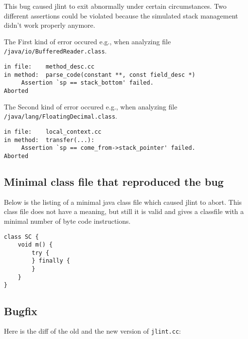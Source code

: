 \documentclass[11pt,twoside,a4paper,draft]{article}
\begin{document}
This bug caused jlint to exit abnormally under certain circumstances.
Two different assertions could be violated because the simulated stack
management didn't work properly anymore. 

The First kind of error occured e.g., when analyzing file \newline
\texttt{/java/io/BufferedReader.class}.

\begin{verbatim}
in file:    method_desc.cc
in method:  parse_code(constant **, const field_desc *)
	 Assertion `sp == stack_bottom' failed.
Aborted
\end{verbatim}

The Second kind of error occured e.g., when analyzing file \newline
\texttt{/java/lang/FloatingDecimal.class}.

\begin{verbatim}
in file:    local_context.cc
in method:  transfer(...):
	 Assertion `sp == come_from->stack_pointer' failed.
Aborted 
\end{verbatim}

\subsection {Minimal class file that reproduced the bug}

Below is the listing of a minimal java class file which caused jlint to abort.
This class file does not have a meaning, but still it is valid and gives a
classfile with a minimal number of byte code instructions. 

\begin{verbatim}
class SC {
    void m() {
        try {
        } finally {
        }
    }
}
\end{verbatim}


\subsection {Bugfix}

Here is the diff of the old and the new version of \texttt{jlint.cc}:
\end{document}
